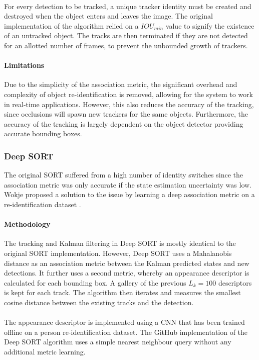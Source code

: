 \paragraph{} For every detection to be tracked, a unique tracker identity must be created and destroyed when the object enters and leaves the image. The original implementation of the algorithm relied on a $IOU_{min}$ value to signify the existence of an untracked object. The tracks are then terminated if they are not detected for an allotted number of frames, to prevent the unbounded growth of trackers.

\paragraph{Limitations}
Due to the simplicity of the association metric, the significant overhead and complexity of object re-identification is removed, allowing for the system to work in real-time applications. However, this also reduces the accuracy of the tracking, since occlusions will spawn new trackers for the same objects. Furthermore, the accuracy of the tracking is largely dependent on the object detector providing accurate bounding boxes.

\subsubsection{Deep SORT}
The original SORT suffered from a high number of identity switches since the association metric was only accurate if the state estimation uncertainty was low. Wokje proposed a solution to the issue by learning a deep association metric on a re-identification dataset \cite{Wojke2018}. 

\paragraph{Methodology} The tracking and Kalman filtering in Deep SORT is mostly identical to the original SORT implementation. However, Deep SORT uses a Mahalanobis distance as an association metric between the Kalman predicted states and new detections. It further uses a second metric, whereby an appearance descriptor is calculated for each bounding box. A gallery of the previous $L_{k} = 100$ descriptors is kept for each track. The algorithm then iterates and measures the smallest cosine distance between the existing tracks and the detection.

\paragraph{} The appearance descriptor is implemented using a CNN that has been trained offline on a person re-identification dataset. The GitHub implementation of the Deep SORT algorithm uses a simple nearest neighbour query without any additional metric learning.

